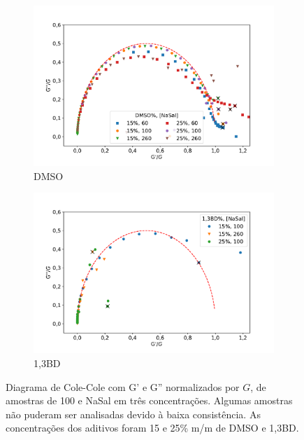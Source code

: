 		\begin{figure}[h]
			\begin{subfigure}[t]{0.5\textwidth}
				\centering
				\includegraphics[width=\textwidth]{imagens/reologia/colecole_dmso}
				\caption{DMSO}
				\label{fig:colecole_dmso}
			\end{subfigure} %
			\begin{subfigure}[t]{0.5\textwidth}
				\centering
				\includegraphics[width=\textwidth]{imagens/reologia/colecole_13bd}
				\caption{1,3BD}
				\label{fig:colecole_13bd}
			\end{subfigure} %
			\caption{Diagrama de Cole-Cole com G' e G'' normalizados por \(G\), de amostras de \CTAB{} 100 \mM{} e NaSal em três concentrações. Algumas amostras não puderam ser analisadas devido à baixa consistência. As concentrações dos aditivos foram 15 e 25\% m/m de DMSO e 1,3BD.}
			\label{fig:colecole_dmso_13bd}
		\end{figure}
		
